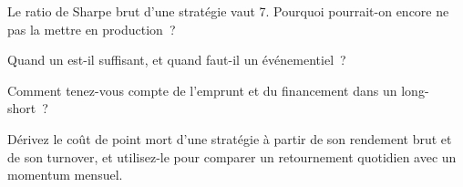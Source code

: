 \begin{interviewq}\label{iq:rs:vectorised-backtests:3}
Le ratio de Sharpe brut d'une stratégie vaut 7. Pourquoi pourrait-on encore ne pas la mettre en production~?
\end{interviewq}

\begin{interviewq}\label{iq:rs:vectorised-backtests:4}
Quand un  est-il suffisant, et quand faut-il un  événementiel~?
\end{interviewq}

\begin{interviewq}\label{iq:rs:vectorised-backtests:5}
Comment tenez-vous compte de l'emprunt et du financement dans un  long-short~?
\end{interviewq}

\begin{interviewq}\label{iq:rs:vectorised-backtests:6}
Dérivez le coût de point mort d'une stratégie à partir de son rendement brut et de son turnover, et utilisez-le pour comparer un retournement quotidien avec un momentum mensuel.
\end{interviewq}

